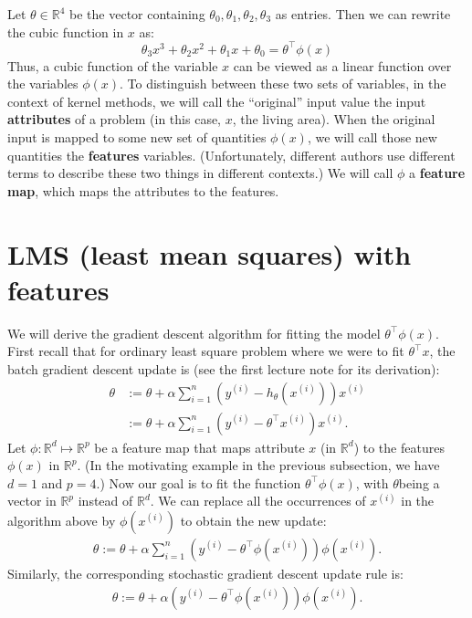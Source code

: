 Let $\theta \in \mathbb{R}^4$ be the vector containing $\theta_0 ,\theta_1 ,\theta_2 ,\theta_3$ as entries. Then we can
rewrite the cubic function in $x$ as:
\begin{equation*}
    \theta_3 x^3 + \theta_2 x^2 + \theta_1 x + \theta_0 = \theta^\top \phi(x)
\end{equation*}
Thus, a cubic function of the variable $x$ can be viewed as a linear function
over the variables $\phi(x)$. To distinguish between these two sets of variables,
in the context of kernel methods, we will call the ``original'' input value the
input \textbf{attributes} of a problem (in this case, $x$, the living area). When the
original input is mapped to some new set of quantities $\phi(x)$, we will call those
new quantities the \textbf{features} variables. (Unfortunately, different authors use
different terms to describe these two things in different contexts.) We will
call $\phi$ a \textbf{feature map}, which maps the attributes to the features.

\section{LMS (least mean squares) with features}
We will derive the gradient descent algorithm for fitting the model $\theta^\top \phi(x)$.
First recall that for ordinary least square problem where we were to fit $\theta^\top x$,
the batch gradient descent update is (see the first lecture note for its derivation): %
\begin{align}
    \theta &:= \theta + \alpha \sum_{i=1}^n \left( y^{(i)} - h_\theta (x^{(i)}) \right) x^{(i)}\\
           &:= \theta + \alpha \sum_{i=1}^n \left( y^{(i)} - \theta^\top x^{(i)} \right) x^{(i)}.\label{eq:lms_features}
\end{align}
Let $\phi : \mathbb{R}^d \mapsto \mathbb{R}^p$ be a feature map that maps attribute $x$ (in $\mathbb{R}^d$) to the
features $\phi(x)$ in $\mathbb{R}^p$. (In the motivating example in the previous subsection,
we have $d = 1$ and $p = 4$.) Now our goal is to fit the function $\theta^\top \phi(x)$, with
$\theta $being a vector in $\mathbb{R}^p$ instead of $\mathbb{R}^d$. We can replace all the occurrences of
$x^{(i)}$ in the algorithm above by $\phi(x^{(i)})$ to obtain the new update:
\begin{align}
    \theta := \theta + \alpha \sum_{i=1}^n \left( y^{(i)} - \theta^\top \phi(x^{(i)}) \right) \phi(x^{(i)}).\label{eq:lms_feature_map}
\end{align}
Similarly, the corresponding stochastic gradient descent update rule is: %
\begin{align}
    \theta := \theta + \alpha \left( y^{(i)} - \theta^\top \phi(x^{(i)}) \right) \phi(x^{(i)}).
\end{align}

